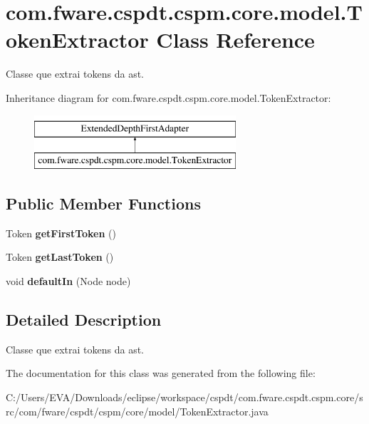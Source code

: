 \hypertarget{classcom_1_1fware_1_1cspdt_1_1cspm_1_1core_1_1model_1_1_token_extractor}{}\section{com.\+fware.\+cspdt.\+cspm.\+core.\+model.\+Token\+Extractor Class Reference}
\label{classcom_1_1fware_1_1cspdt_1_1cspm_1_1core_1_1model_1_1_token_extractor}


Classe que extrai tokens da ast.  


Inheritance diagram for com.\+fware.\+cspdt.\+cspm.\+core.\+model.\+Token\+Extractor\+:\begin{figure}[H]
\begin{center}
\leavevmode
\includegraphics[height=2.000000cm]{classcom_1_1fware_1_1cspdt_1_1cspm_1_1core_1_1model_1_1_token_extractor}
\end{center}
\end{figure}
\subsection*{Public Member Functions}
\begin{DoxyCompactItemize}
\item 
\mbox{\label{classcom_1_1fware_1_1cspdt_1_1cspm_1_1core_1_1model_1_1_token_extractor_a263d3c54e093019448fce4a8a8a7bd1f}} 
Token {\bfseries get\+First\+Token} ()
\item 
\mbox{\label{classcom_1_1fware_1_1cspdt_1_1cspm_1_1core_1_1model_1_1_token_extractor_ab9ccc78cbbe7c3d1fc54f7bdd8301572}} 
Token {\bfseries get\+Last\+Token} ()
\item 
\mbox{\label{classcom_1_1fware_1_1cspdt_1_1cspm_1_1core_1_1model_1_1_token_extractor_a760a9a62e1352ccda5e0bf35feeb86f9}} 
void {\bfseries default\+In} (Node node)
\end{DoxyCompactItemize}


\subsection{Detailed Description}
Classe que extrai tokens da ast. 

The documentation for this class was generated from the following file\+:\begin{DoxyCompactItemize}
\item 
C\+:/\+Users/\+E\+V\+A/\+Downloads/eclipse/workspace/cspdt/com.\+fware.\+cspdt.\+cspm.\+core/src/com/fware/cspdt/cspm/core/model/Token\+Extractor.\+java\end{DoxyCompactItemize}
